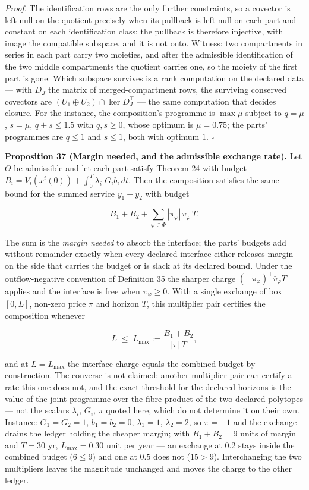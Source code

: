 \documentclass[11pt]{article}
\begin{document}
\emph{Proof.} The identification rows are the only further constraints, so a covector is left-null on the quotient precisely when its pullback is left-null on each part and constant on each identification class; the pullback is therefore injective, with image the compatible subspace, and it is not onto. Witness: two compartments in series in each part carry two moieties, and after the admissible identification of the two middle compartments the quotient carries one, so the moiety of the first part is gone. Which subspace survives is a rank computation on the declared data --- with \(D_J\) the matrix of merged-compartment rows, the surviving conserved covectors are \((U_1 \oplus U_2) \cap \ker D_J^{\top}\) --- the same computation that decides closure. For the instance, the composition's programme is \(\max \mu\) subject to \(q = \mu\), \(s = \mu\), \(q + s \le 1.5\) with \(q, s \ge 0\), whose optimum is \(\mu = 0.75\); the parts' programmes are \(q \le 1\) and \(s \le 1\), both with optimum \(1\). \(\square\)

\textbf{Proposition 37 (Margin needed, and the admissible exchange rate).} Let \(\Theta\) be admissible and let each part satisfy Theorem 24 with budget \(B_i =\allowbreak{} V_i(x^i(0)) +\allowbreak{} \int_0^T \lambda_i^{\top} G_i b_i\,\allowbreak{}dt\). Then the composition satisfies the same bound for the summed service \(y_1 + y_2\) with budget 

$$B_1 + B_2 + \sum_{\varphi \in \Phi} |\pi_\varphi|\, \bar v_\varphi\, T .$$

 The sum is the \emph{margin needed} to absorb the interface; the parts' budgets add without remainder exactly when every declared interface either releases margin on the side that carries the budget or is slack at its declared bound. Under the outflow-negative convention of Definition 35 the sharper charge \((-\pi_\varphi)^{+\allowbreak{}}\bar v_\varphi T\) applies and the interface is free when \(\pi_\varphi \ge 0\). With a single exchange of box \([0, L]\), non-zero price \(\pi\) and horizon \(T\), this multiplier pair certifies the composition whenever 

$$L \;\le\; L_{\max} := \frac{B_1 + B_2}{|\pi|\, T},$$

 and at \(L = L_{\max}\) the interface charge equals the combined budget by construction. The converse is not claimed: another multiplier pair can certify a rate this one does not, and the exact threshold for the declared horizons is the value of the joint programme over the fibre product of the two declared polytopes --- not the scalars \(\lambda_i\), \(G_i\), \(\pi\) quoted here, which do not determine it on their own. Instance: \(G_1 = G_2 = 1\), \(b_1 = b_2 = 0\), \(\lambda_1 = 1\), \(\lambda_2 = 2\), so \(\pi = -1\) and the exchange drains the ledger holding the cheaper margin; with \(B_1 + B_2 = 9\) units of margin and \(T = 30\) yr, \(L_{\max} = 0.30\) unit per year --- an exchange at \(0.2\) stays inside the combined budget (\(6 \le 9\)) and one at \(0.5\) does not (\(15 > 9\)). Interchanging the two multipliers leaves the magnitude unchanged and moves the charge to the other ledger.
\end{document}
